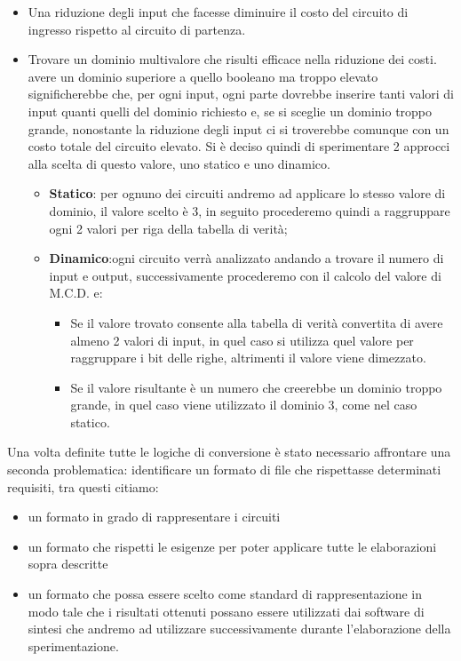 \documentclass[italian,]{book}
\providecommand{\tightlist}{%
  \setlength{\itemsep}{0pt}\setlength{\parskip}{0pt}}
\begin{document}
\begin{itemize}
\item
  Una riduzione degli input che facesse diminuire il costo del circuito di ingresso rispetto al circuito di partenza.
\item
  Trovare un dominio multivalore che risulti efficace nella riduzione dei costi. avere un dominio superiore a quello booleano ma troppo elevato significherebbe che, per ogni input, ogni parte dovrebbe inserire tanti valori di input quanti quelli del dominio richiesto e, se si sceglie un dominio troppo grande, nonostante la riduzione degli input ci si troverebbe comunque con un costo totale del circuito elevato. Si è deciso quindi di sperimentare 2 approcci alla scelta di questo valore, uno statico e uno dinamico.

  \begin{itemize}
  \tightlist
  \item
    \textbf{Statico}: per ognuno dei circuiti andremo ad applicare lo stesso valore di dominio, il valore scelto è 3, in seguito procederemo quindi a raggruppare ogni 2 valori per riga della tabella di verità;
  \item
    \textbf{Dinamico}:ogni circuito verrà analizzato andando a trovare il numero di input e output, successivamente procederemo con il calcolo del valore di M.C.D. e:

    \begin{itemize}
    \tightlist
    \item
      Se il valore trovato consente alla tabella di verità convertita di avere almeno 2 valori di input, in quel caso si utilizza quel valore per raggruppare i bit delle righe, altrimenti il valore viene dimezzato.
    \item
      Se il valore risultante è un numero che creerebbe un dominio troppo grande, in quel caso viene utilizzato il dominio 3, come nel caso statico.
    \end{itemize}
  \end{itemize}
\end{itemize}

Una volta definite tutte le logiche di conversione è stato necessario affrontare una seconda problematica: identificare un formato di file che rispettasse determinati requisiti, tra questi citiamo:

\begin{itemize}
\tightlist
\item
  un formato in grado di rappresentare i circuiti
\item
  un formato che rispetti le esigenze per poter applicare tutte le elaborazioni sopra descritte
\item
  un formato che possa essere scelto come standard di rappresentazione in modo tale che i risultati ottenuti possano essere utilizzati dai software di sintesi che andremo ad utilizzare successivamente durante l'elaborazione della sperimentazione.
\end{itemize}
\end{document}
